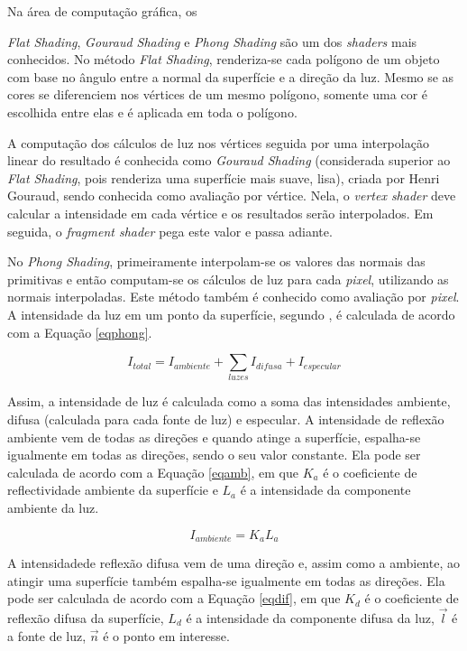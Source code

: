 	Na área de computação gráfica, os {\textit{Flat Shading}, \textit{Gouraud Shading} e \textit{Phong Shading} são um dos \textit{shaders} mais conhecidos. No método \textit{Flat Shading}, renderiza-se cada polígono de um objeto com base no ângulo entre a normal da superfície e a direção da luz. Mesmo se as cores se diferenciem nos vértices de um mesmo polígono, somente uma cor é escolhida entre elas e é aplicada em toda o polígono.  

	A computação dos cálculos de luz nos  vértices seguida por uma interpolação linear do resultado é conhecida como \textit{Gouraud Shading} (considerada superior ao \textit{Flat Shading}, pois renderiza uma superfície mais suave, lisa), criada por Henri Gouraud, sendo conhecida como avaliação por vértice. Nela, o \textit{vertex shader} deve calcular a intensidade em cada vértice e os resultados serão interpolados. Em seguida, o \textit{fragment shader} pega este valor e passa adiante. 

	No \textit{Phong Shading}, primeiramente interpolam-se os valores das normais das primitivas e então computam-se os cálculos de luz para cada \textit{pixel}, utilizando as normais interpoladas. Este método também é conhecido como avaliação por \textit{pixel}. A intensidade da luz em um ponto da superfície, segundo \cite{guha2011}, é calculada de acordo com a Equação \ref{eqphong}.  

	\begin{equation}
		I_ {total} = I_ {ambiente} +  \sum\limits_ {luzes} I_ {difusa} + I_ {especular}
	\label{eqphong}
	\end{equation}

	Assim, a intensidade de luz é calculada como a soma das intensidades ambiente, difusa (calculada para cada fonte de luz) e especular.  A intensidade de reflexão ambiente vem de todas as direções e quando atinge a superfície, espalha-se igualmente em todas as direções, sendo o seu valor constante. Ela pode ser calculada de acordo com a Equação \ref{eqamb}, em que $K_ {a}$ é o coeficiente de reflectividade ambiente da superfície e $L_ {a}$ é a intensidade da componente ambiente da luz.

	\begin{equation}
		I_ {ambiente} = K_ {a}L_ {a} 
	\label{eqamb}
	\end{equation}

	A intensidadede reflexão difusa vem de uma direção e, assim como a ambiente, ao atingir uma superfície também espalha-se igualmente em todas as direções. Ela pode ser calculada de acordo com a Equação \ref{eqdif}, em que $K_ {d}$ é o coeficiente de reflexão difusa da superfície, $L_ {d}$ é a intensidade da componente difusa da luz, $\overrightarrow{ l}$ é a fonte de luz, $\overrightarrow{ n}$ é o ponto em interesse.

}
